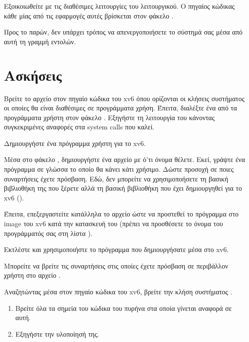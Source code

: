 \documentclass[18pt]{extarticle}
\begin{document}
Εξοικοιωθείτε με τις διαθέσιμες λειτουργίες του λειτουργικού. Ο πηγαίος κώδικας κάθε μίας από τις εφαρμογές αυτές βρίσκεται στον φάκελο .

Προς το παρών, δεν υπάρχει τρόπος να απενεργοποιήσετε το σύστημά σας μέσα από αυτή τη γραμμή εντολών.

\section{Ασκήσεις}

\begin{question}
    Βρείτε το αρχείο στον πηγαίο κώδικα του xv6 όπου ορίζονται οι κλήσεις συστήματος οι οποίες θα είναι διαθέσιμες σε προγράμματα χρήση.
    Έπειτα, διαλέξτε ένα από τα προγράμματα χρήστη στον φάκελο . Εξηγήστε τη λειτουργία του κάνοντας συγκεκριμένες αναφορές στα system calls που καλεί.
\end{question}

\begin{question}
    Δημιουργήστε ένα πρόγραμμα χρήστη για το xv6.

    Μέσα στο φάκελο , δημιουργήστε ένα αρχείο με ό'τι όνομα θέλετε. Εκεί, γράψτε ένα πρόγραμμα
    σε γλώσσα  το οποίο θα κάνει κάτι χρήσιμο. Δώστε προσοχή 
    σε ποιες συναρτήσεις έχετε πρόσβαση. Εδώ, δεν μπορείτε να χρησιμοποήσετε τη βασική βιβλιοθήκη της  που ξέρετε
    αλλά τη βασική βιβλιοθήκη που έχει δημιουργηθεί για το xv6 ().

    Έπειτα, επεξεργαστείτε κατάλληλα το αρχείο  ώστε να προστεθεί το πρόγραμμα στο image του xv6 κατά την κατασκευή του (πρέπει να προσθέσετε το όνομα του προγράμματός σας στη λίστα ).

    Εκτλέστε  και χρησιμοποιήστε το πρόγραμμα που δημιουργήσατε μέσα στο xv6.

    \begin{info}[Σημείωση:]
        Μπορείτε να βρείτε τις συναρτήσεις στις οποίες έχετε πρόσβαση σε περιβάλλον χρήστη στο αρχείο .
    \end{info}

\end{question}

\begin{question}
    Αναζητώντας μέσα στον πηγαίο κώδικα του xv6, βρείτε την 
    κλήση συστήματος .

    \begin{enumerate}
        \item Βρείτε όλα τα σημεία του κώδικα του πυρήνα στα οποία γίνεται αναφορά σε αυτή.
        \item Εξηγήστε την υλοποίησή της.
    \end{enumerate}
\end{question}
\end{document}
